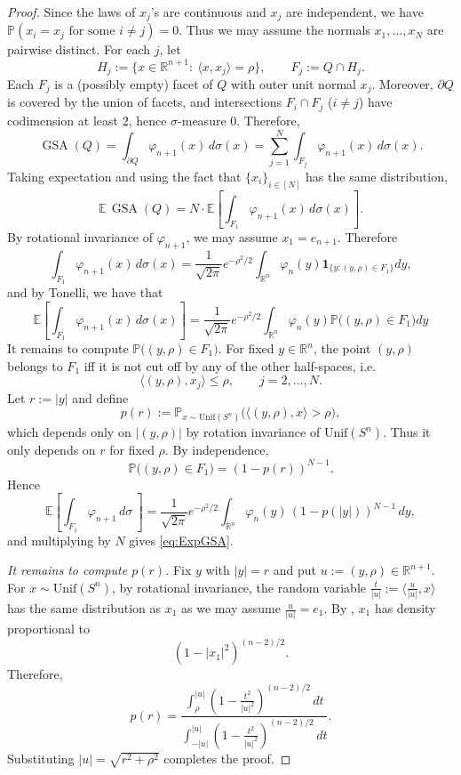\documentclass[11pt]{article}
\begin{document}
\begin{proof}
Since the laws of $x_j$'s are continuous and $x_j$ are independent, we have
$\mathbb{P}(x_i=x_j\text{ for some }i\neq j)=0$. Thus we may assume the normals
$x_1,\dots,x_N$ are pairwise distinct. For each $j$, let
\[
H_j:=\{x\in\mathbb{R}^{n+1}:\ \langle x,x_j\rangle=\rho\},
\qquad
F_j:=Q\cap H_j.
\]
Each $F_j$ is a (possibly empty) facet of $Q$ with outer unit normal $x_j$.
Moreover, $\partial Q$ is covered by the union of facets, and intersections
$F_i\cap F_j$ ($i\neq j$) have codimension at least $2$, hence $\sigma$-measure $0$.
Therefore,
\[
\operatorname{GSA}(Q)=\int_{\partial Q}\varphi_{n+1}(x)\,d\sigma(x)
=\sum_{j=1}^N\int_{F_j}\varphi_{n+1}(x)\,d\sigma(x).
\]
Taking expectation and using the fact that $\{x_i\}_{i \in [N]}$ has the same distribution,
\[
\mathbb{E}\,\operatorname{GSA}(Q)
=
N\cdot \mathbb{E}\!\left[\int_{F_1}\varphi_{n+1}(x)\,d\sigma(x)\right].
\]
By rotational invariance of $\varphi_{n+1}$, we may assume $x_1=e_{n+1}$. Therefore \[
\int_{F_1}\varphi_{n+1}(x)\,d\sigma(x) = \frac{1}{\sqrt{2\pi}}e^{-\rho^2/2}\int_{\mathbb{R}^n} \varphi_n(y) \mathbf{1}_{\{y:(y,\rho) \in F_1\}} dy,
\]
and by Tonelli, we have that 
\[
\mathbb{E}\!\left[\int_{F_1}\varphi_{n+1}(x)\,d\sigma(x)\right] =  \frac{1}{\sqrt{2\pi}}e^{-\rho^2/2}\int_{\mathbb{R}^n} \varphi_n(y) \mathbb{P}\big((y,\rho) \in F_1 \big) dy
\]
It remains to compute $\mathbb{P}\big((y,\rho) \in F_1 \big)$. For fixed $y\in\mathbb{R}^n$, the point $(y,\rho)$ belongs to $F_1$ iff it is not cut off
by any of the other half-spaces, i.e.
\[
\langle (y,\rho),x_j\rangle\le \rho,\qquad j=2,\dots,N.
\]
Let $r:=|y|$ and define
\[
p(r):=\mathbb{P}_{x\sim \mathrm{Unif}(S^n)}\big(\langle (y,\rho),x\rangle>\rho\big),
\]
which depends only on $|(y,\rho)|$ by rotation invariance of  $\mathrm{Unif}(S^n)$. Thus it only depends on $r$ for fixed $\rho$.
By independence,
\[
\mathbb{P}\big((y,\rho)\in F_1)=(1-p(r))^{N-1}.
\]
Hence
\[
\mathbb{E}\!\left[\int_{F_1}\varphi_{n+1}\,d\sigma\ \right]
=
\frac{1}{\sqrt{2\pi}}e^{-\rho^2/2}
\int_{\mathbb{R}^n}\varphi_n(y)\,(1-p(|y|))^{N-1}\,dy,
\]
and multiplying by $N$ gives \eqref{eq:ExpGSA}.

\emph{It remains to compute $p(r)$.} Fix $y$ with $|y|=r$ and put $u:=(y,\rho)\in\mathbb{R}^{n+1}$. For $x\sim \mathrm{Unif}(S^n)$, by rotational invariance, the random variable
$\frac{t}{|u|}:=\langle \frac{u}{|u|},x\rangle$ has the same distribution as $x_1$ as we may assume $\frac{u}{|u|}=e_1$. By \cite[Eq.~(8)]{BubeckDingEldanRacz16}, $x_1$ has density proportional to
\[
(1-|x_1|^2)^{(n-2)/2}.
\]
Therefore,
\[
p(r)=
\frac{\displaystyle\int_{\rho}^{|u|}
\left(1-\frac{t^2}{|u|^2}\right)^{(n-2)/2}\,dt}
{\displaystyle\int_{-|u|}^{|u|}
\left(1-\frac{t^2}{|u|^2}\right)^{(n-2)/2}\,dt}.
\]
Substituting $|u|=\sqrt{r^2+\rho^2}$ completes the proof. 
\end{proof}
\end{document}
